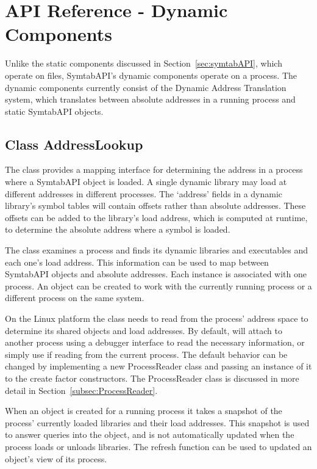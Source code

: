 \section{API Reference - Dynamic Components}

Unlike the static components discussed in Section~\ref{sec:symtabAPI}, which operate on files,
SymtabAPI's dynamic components operate on a process. The dynamic components currently consist of the Dynamic Address Translation system, which translates between absolute addresses in a running process and static SymtabAPI objects.

\subsection{Class AddressLookup}


The  class provides a mapping interface for determining the address in a process where a SymtabAPI object is loaded. A single dynamic library may load at different addresses in different processes. The `address' fields in a dynamic library's symbol tables will contain offsets rather than absolute addresses. These offsets can be added to the library's load address, which is computed at runtime, to determine the absolute address where a symbol is loaded.

The  class examines a process and finds its dynamic libraries and executables and each one's load address. This information can be used to map between SymtabAPI objects and absolute addresses. Each  instance is associated with one process. An  object can be created to work with the currently running process or a different process on the same system.

On the Linux platform the  class needs to read from the process' address space to determine its shared objects and load addresses. By default,  will attach to another process using a debugger interface to read the necessary information, or simply use  if reading from the current process. The default behavior can be changed by implementing a new ProcessReader class and passing an instance of it to the
create factor constructors. The ProcessReader class is discussed in more detail in Section~\ref{subsec:ProcessReader}.

When an  object is created for a running process it takes a snapshot of the process' currently loaded libraries and their load addresses. This snapshot is used to answer queries into the  object, and is not automatically updated when the process loads or unloads libraries. The refresh function can be used to updated an  object's view of its process.

